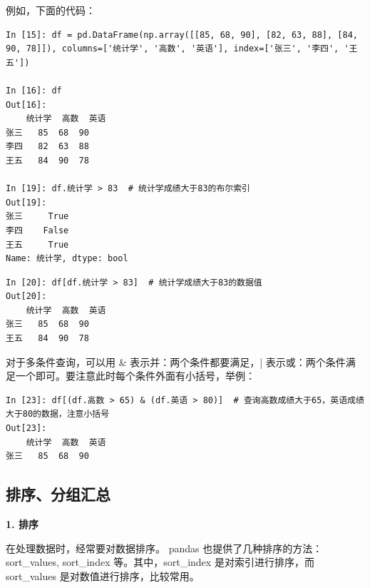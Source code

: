 例如，下面的代码：

\begin{lstlisting}[Language=Python]
In [15]: df = pd.DataFrame(np.array([[85, 68, 90], [82, 63, 88], [84, 90, 78]]), columns=['统计学', '高数', '英语'], index=['张三', '李四', '王五'])

In [16]: df
Out[16]:
    统计学  高数  英语
张三   85  68  90
李四   82  63  88
王五   84  90  78

In [19]: df.统计学 > 83  # 统计学成绩大于83的布尔索引
Out[19]:
张三     True
李四    False
王五     True
Name: 统计学, dtype: bool
\end{lstlisting}


\begin{lstlisting}[Language=Python]
In [20]: df[df.统计学 > 83]  # 统计学成绩大于83的数据值
Out[20]:
    统计学  高数  英语
张三   85  68  90
王五   84  90  78
\end{lstlisting}

对于多条件查询，可以用 \& 表示并：两个条件都要满足，| 表示或：两个条件满足一个即可。要注意此时每个条件外面有小括号，举例：

\begin{lstlisting}[Language=Python]
In [23]: df[(df.高数 > 65) & (df.英语 > 80)]  # 查询高数成绩大于65，英语成绩大于80的数据，注意小括号
Out[23]:
    统计学  高数  英语
张三   85  68  90
\end{lstlisting}



\subsection{排序、分组汇总}

\vspace{3pt}
\noindent\textbf{1. 排序}
\vspace{3pt}

在处理数据时，经常要对数据排序。 pandas 也提供了几种排序的方法： sort\_values,  sort\_index 等。其中，sort\_index 是对索引进行排序，而 sort\_values 是对数值进行排序，比较常用。

